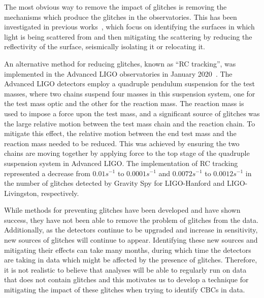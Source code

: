 The most obvious way to remove the impact of glitches is removing the mechanisms which produce the glitches in the observatories. This has been investigated in previous works~\cite{reducing_scattering:2020, TAccadia:2010, Nuttall:2018, gwadaptive:2022, HilbertHuang:2017, tvf-EMD:2020, Scattering_Monitoring:2022, Was_Subtract:2021}, which focus on identifying the surfaces in which light is being scattered from and then mitigating the scattering by reducing the reflectivity of the surface, seismically isolating it or relocating it. 

An alternative method for reducing \scladj glitches, known as ``RC tracking'', was implemented in the Advanced LIGO observatories in January 2020~\cite{reducing_scattering:2020}. The Advanced LIGO detectors employ a quadruple pendulum suspension for the test masses, where two chains suspend four masses in this suspension system, one for the test mass optic and the other for the reaction mass. The reaction mass is used to impose a force upon the test mass, and a significant source of \scladj glitches was the large relative motion between the test mass chain and the reaction chain. To mitigate this effect, the relative motion between the end test mass and the reaction mass needed to be reduced. This was achieved by ensuring the two chains are moving together by applying force to the top stage of the quadruple suspension system in Advanced LIGO. The implementation of RC tracking represented a decrease from $0.01 s^{-1}$ to $0.0001 s^{-1}$ and $0.0072 s^{-1}$ to $0.0012 s^{-1}$ in the number of \scladj glitches detected by Gravity Spy for LIGO-Hanford and LIGO-Livingston, respectively.

While methods for preventing \scladj glitches have been developed and have shown success, they have not been able to remove the problem of \scladj glitches from the data. Additionally, as the detectors continue to be upgraded and increase in sensitivity, new sources of \scladj glitches will continue to appear. Identifying these new sources and mitigating their effects can take many months, during which time the detectors are taking in data which might be affected by the presence of \scladj glitches. Therefore, it is not realistic to believe that analyses will be able to regularly run on data that does not contain \scladj glitches and this motivates us to develop a technique for mitigating the impact of these glitches when trying to identify CBCs in \gwadj data.

